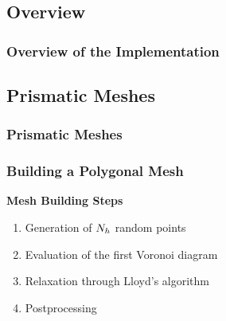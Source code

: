 \subsection{Overview}

\begin{frame}
    \frametitle{Overview of the Implementation}

    
\end{frame}

\subsection{Prismatic Meshes}

\begin{frame}
    \frametitle{Prismatic Meshes}

    
\end{frame}

\begin{frame} %
    \frametitle{Building a Polygonal Mesh}

    \vspace*{\fill}
    \begin{multicols}{2}
        
        \vspace*{\fill}
        \begin{center}
            {\color{\accentcolor} \Large \textbf{Mesh Building Steps}}
            \vspace*{0.5cm}

            \begin{minipage}{0.4\textwidth}
                \begin{enumerate}
                    \item Generation of $N_h$ random points
                    \item Evaluation of the first Voronoi diagram
                    \item Relaxation through Lloyd's algorithm
                    \item Postprocessing
                \end{enumerate}
            \end{minipage}
        \end{center}
        \vspace*{\fill}

        \vfill\null
        \columnbreak

        \vspace*{\fill}
        \begin{figure}[!ht]
            \centering
            
        \end{figure}
        \vspace*{\fill}

    \end{multicols}
    \vspace*{\fill}
    
\end{frame}

